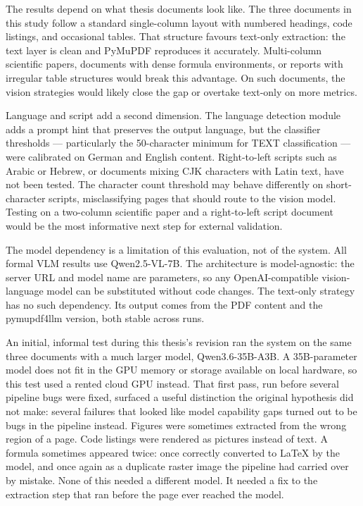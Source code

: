 The results depend on what thesis documents look like. The three documents in this study follow a standard single-column layout with numbered headings, code listings, and occasional tables. That structure favours text-only extraction: the text layer is clean and PyMuPDF reproduces it accurately. Multi-column scientific papers, documents with dense formula environments, or reports with irregular table structures would break this advantage. On such documents, the vision strategies would likely close the gap or overtake text-only on more metrics.

Language and script add a second dimension. The language detection module adds a prompt hint that preserves the output language, but the classifier thresholds --- particularly the 50-character minimum for TEXT classification --- were calibrated on German and English content. Right-to-left scripts such as Arabic or Hebrew, or documents mixing CJK characters with Latin text, have not been tested. The character count threshold may behave differently on short-character scripts, misclassifying pages that should route to the vision model. Testing on a two-column scientific paper and a right-to-left script document would be the most informative next step for external validation.

The model dependency is a limitation of this evaluation, not of the system. All formal VLM results use Qwen2.5-VL-7B. The architecture is model-agnostic: the server URL and model name are parameters, so any OpenAI-compatible vision-language model can be substituted without code changes. The text-only strategy has no such dependency. Its output comes from the PDF content and the pymupdf4llm version, both stable across runs.

An initial, informal test during this thesis's revision ran the system on the same three documents with a much larger model, Qwen3.6-35B-A3B. A 35B-parameter model does not fit in the GPU memory or storage available on local hardware, so this test used a rented cloud GPU instead. That first pass, run before several pipeline bugs were fixed, surfaced a useful distinction the original hypothesis did not make: several failures that looked like model capability gaps turned out to be bugs in the pipeline instead. Figures were sometimes extracted from the wrong region of a page. Code listings were rendered as pictures instead of text. A formula sometimes appeared twice: once correctly converted to \LaTeX{} by the model, and once again as a duplicate raster image the pipeline had carried over by mistake. None of this needed a different model. It needed a fix to the extraction step that ran before the page ever reached the model.

